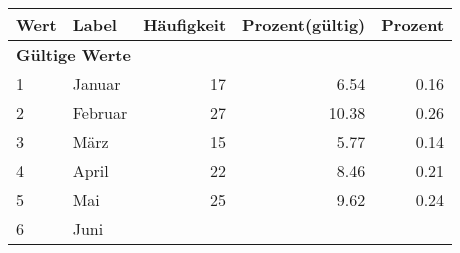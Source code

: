      \begin{longtable}{lXrrr}
     \toprule
     \textbf{Wert} & \textbf{Label} & \textbf{Häufigkeit} & \textbf{Prozent(gültig)} & \textbf{Prozent} \\
     \endhead
     \midrule
     \multicolumn{5}{l}{\textbf{Gültige Werte}}\\

     1 &
     \multicolumn{1}{X}{ Januar   } &


       \num{17} &
       \num[round-mode=places,round-precision=2]{6,54} &
         \num[round-mode=places,round-precision=2]{0,16} \\

     2 &
     \multicolumn{1}{X}{ Februar   } &


       \num{27} &
       \num[round-mode=places,round-precision=2]{10,38} &
         \num[round-mode=places,round-precision=2]{0,26} \\

     3 &
     \multicolumn{1}{X}{ März   } &


       \num{15} &
       \num[round-mode=places,round-precision=2]{5,77} &
         \num[round-mode=places,round-precision=2]{0,14} \\

     4 &
     \multicolumn{1}{X}{ April   } &


       \num{22} &
       \num[round-mode=places,round-precision=2]{8,46} &
         \num[round-mode=places,round-precision=2]{0,21} \\

     5 &
     \multicolumn{1}{X}{ Mai   } &


       \num{25} &
       \num[round-mode=places,round-precision=2]{9,62} &
         \num[round-mode=places,round-precision=2]{0,24} \\

     6 &
     \multicolumn{1}{X}{ Juni   } &



\end{longtable}
